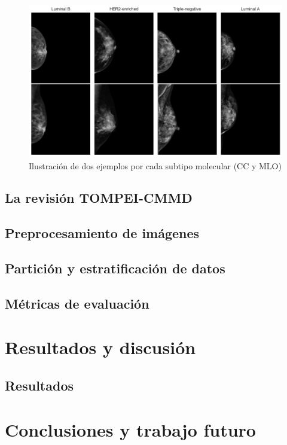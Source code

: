 \documentclass[a4paper,10pt]{book}
\begin{document}
\begin{figure}
    \centering
    \includegraphics[width=1\linewidth]{reports//assets/images_examples.png}
    \caption{Ilustración de dos ejemplos por cada subtipo molecular (CC y MLO)}
    \label{fig:cmmd-examples}
\end{figure}

\section{La revisión TOMPEI-CMMD}
\section{Preprocesamiento de imágenes}
\section{Partición y estratificación de datos}
\section{Métricas de evaluación}


\chapter{Resultados y discusión}
\section{Resultados}

\chapter{Conclusiones y trabajo futuro}

\backmatter
{}


\end{document}

